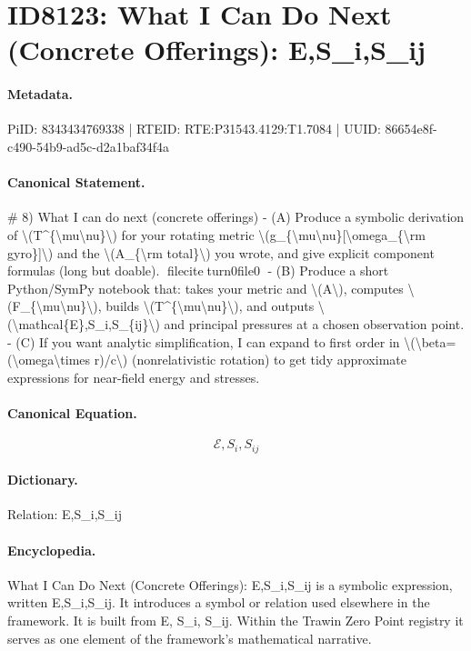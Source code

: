 \section*{ID8123: What I Can Do Next (Concrete Offerings): E,S\_i,S\_ij}
\paragraph{Metadata.}
PiID: 8343434769338 | RTEID: RTE:P31543.4129:T1.7084 | UUID: 86654e8f-c490-54b9-ad5c-d2a1baf34f4a

\paragraph{Canonical Statement.}
\# 8) What I can do next (concrete offerings) - (A) Produce a symbolic derivation of \textbackslash{}(T\textasciicircum{}\{\textbackslash{}mu\textbackslash{}nu\}\textbackslash{}) for your rotating metric \textbackslash{}(g\_\{\textbackslash{}mu\textbackslash{}nu\}[\textbackslash{}omega\_\{\textbackslash{}rm gyro\}]\textbackslash{}) and the \textbackslash{}(A\_\{\textbackslash{}rm total\}\textbackslash{}) you wrote, and give explicit component formulas (long but doable). fileciteturn0file0 - (B) Produce a short Python/SymPy notebook that: takes your metric and \textbackslash{}(A\textbackslash{}), computes \textbackslash{}(F\_\{\textbackslash{}mu\textbackslash{}nu\}\textbackslash{}), builds \textbackslash{}(T\textasciicircum{}\{\textbackslash{}mu\textbackslash{}nu\}\textbackslash{}), and outputs \textbackslash{}(\textbackslash{}mathcal\{E\},S\_i,S\_\{ij\}\textbackslash{}) and principal pressures at a chosen observation point. - (C) If you want analytic simplification, I can expand to first order in \textbackslash{}(\textbackslash{}beta=(\textbackslash{}omega\textbackslash{}times r)/c\textbackslash{}) (nonrelativistic rotation) to get tidy approximate expressions for near-field energy and stresses.

\paragraph{Canonical Equation.}
\[
\mathcal{E},S_i,S_{ij}
\]

\paragraph{Dictionary.}
Relation: E,S\_i,S\_ij

\paragraph{Encyclopedia.}
What I Can Do Next (Concrete Offerings): E,S\_i,S\_ij is a symbolic expression, written E,S\_i,S\_ij. It introduces a symbol or relation used elsewhere in the framework. It is built from E, S\_i, S\_ij. Within the Trawin Zero Point registry it serves as one element of the framework's mathematical narrative.
